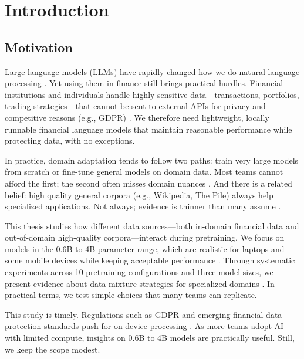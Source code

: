 \chapter{Introduction}

\section{Motivation}

Large language models (LLMs) have rapidly changed how we do natural language processing \parencite{vaswani2017attention,radford2019language,brown2020language,touvron2023llama}. Yet using them in finance still brings practical hurdles. Financial institutions and individuals handle highly sensitive data—transactions, portfolios, trading strategies—that cannot be sent to external APIs for privacy and competitive reasons (e.g., GDPR) \parencite{eu2016gdpr}. We therefore need lightweight, locally runnable financial language models that maintain reasonable performance while protecting data, with no exceptions.

In practice, domain adaptation tends to follow two paths: train very large models from scratch or fine-tune general models on domain data. Most teams cannot afford the first; the second often misses domain nuances \parencite{gururangan2020don}. And there is a related belief: high quality general corpora (e.g., Wikipedia, The Pile) always help specialized applications. Not always; evidence is thinner than many assume \parencite{gao2020pile,raffel2020exploring,longpre2023pretrainer}.

This thesis studies how different data sources—both in‑domain financial data and out‑of‑domain high‑quality corpora—interact during pretraining. We focus on models in the 0.6B to 4B parameter range, which are realistic for laptops and some mobile devices while keeping acceptable performance \parencite{yang2024qwen2,xia2023sheared,team2024gemma,javaheripi2023phi}. Through systematic experiments across 10 pretraining configurations and three model sizes, we present evidence about data mixture strategies for specialized domains \parencite{wu2023bloomberggpt}. In practical terms, we test simple choices that many teams can replicate.

This study is timely. Regulations such as GDPR and emerging financial data protection standards push for on‑device processing \parencite{eu2016gdpr}. As more teams adopt AI with limited compute, insights on 0.6B to 4B models are practically useful. Still, we keep the scope modest.

